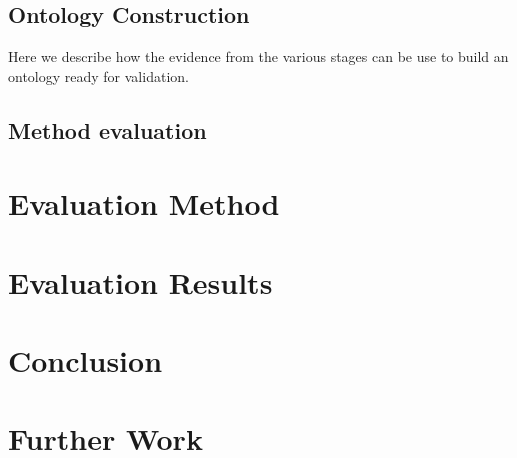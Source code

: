 \documentclass[a4paper]{report}
\begin{document}
\section{Ontology Construction}

Here we describe how the evidence from the various stages can be use to build an ontology ready for validation.

\section{Method evaluation}

\chapter{Evaluation Method}


\chapter{Evaluation Results}


\chapter{Conclusion}


\chapter{Further Work}


\nocite{*}


\clearpage



\end{document}
